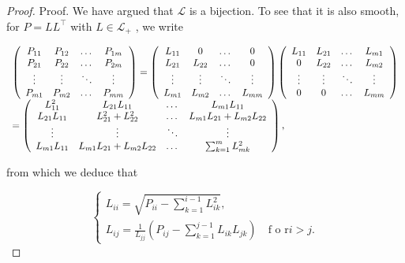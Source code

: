 \documentclass[11pt]{article}
\begin{document}
\begin{proof}
Proof. We have argued that  $\mathcal{L}$  is a bijection. To see that it is also smooth, for  $P = LL^{\top}$  with  $L\in \mathcal{L}_{+}$ , we write

$$
\begin{array}{l} \left( \begin{array}{c c c c} P _ {1 1} & P _ {1 2} & \dots & P _ {1 m} \\ P _ {2 1} & P _ {2 2} & \dots & P _ {2 m} \\ \vdots & \vdots & \ddots & \vdots \\ P _ {m 1} & P _ {m 2} & \dots & P _ {m m} \end{array} \right) = \left( \begin{array}{c c c c} L _ {1 1} & 0 & \dots & 0 \\ L _ {2 1} & L _ {2 2} & \dots & 0 \\ \vdots & \vdots & \ddots & \vdots \\ L _ {m 1} & L _ {m 2} & \dots & L _ {m m} \end{array} \right) \left( \begin{array}{c c c c} L _ {1 1} & L _ {2 1} & \dots & L _ {m 1} \\ 0 & L _ {2 2} & \dots & L _ {m 2} \\ \vdots & \vdots & \ddots & \vdots \\ 0 & 0 & \dots & L _ {m m} \end{array} \right) \\ = \left( \begin{array}{c c c c} L _ {1 1} ^ {2} & L _ {2 1} L _ {1 1} & \dots & L _ {m 1} L _ {1 1} \\ L _ {2 1} L _ {1 1} & L _ {2 1} ^ {2} + L _ {2 2} ^ {2} & \dots & L _ {m 1} L _ {2 1} + L _ {m 2} L _ {2 2} \\ \vdots & \vdots & \ddots & \vdots \\ L _ {m 1} L _ {1 1} & L _ {m 1} L _ {2 1} + L _ {m 2} L _ {2 2} & \dots & \sum_ {k = 1} ^ {m} L _ {m k} ^ {2} \end{array} \right), \\ \end{array}
$$

from which we deduce that

$$
\left\{ \begin{array}{l} L _ {i i} = \sqrt {P _ {i i} - \sum_ {k = 1} ^ {i - 1} L _ {i k} ^ {2}}, \\ L _ {i j} = \frac {1}{L _ {j j}} \left(P _ {i j} - \sum_ {k = 1} ^ {j - 1} L _ {i k} L _ {j k}\right) \quad \text {f o r} i > j. \end{array} \right. \tag {2.1}
$$


\end{proof}
\end{document}
